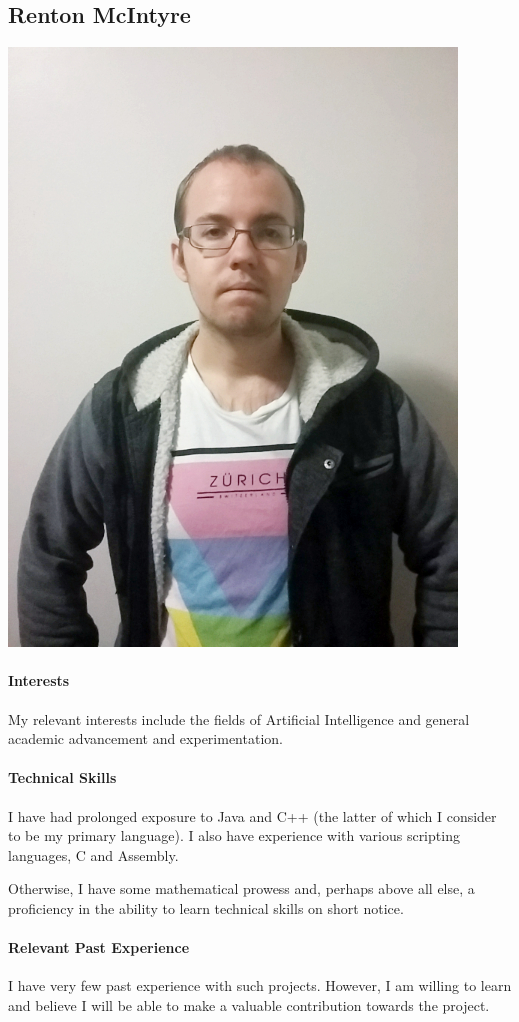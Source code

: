 \documentclass[12pt]{article}
\begin{document}
\subsection{Renton McIntyre}
\includegraphics[scale=0.25]{Renton}
\paragraph{Interests}
My relevant interests include the fields of Artificial Intelligence and general academic advancement and experimentation.
\paragraph{Technical Skills}
I have had prolonged exposure to Java and C++ (the latter of which I consider to be my primary language). I also have experience with various scripting languages, C and Assembly.

Otherwise, I have some mathematical prowess and, perhaps above all else, a proficiency in the ability to learn technical skills on short notice.
\paragraph{Relevant Past Experience}
I have very few past experience with such projects. However, I am willing to learn and believe I will be able to make a valuable contribution towards the project.
\end{document}
